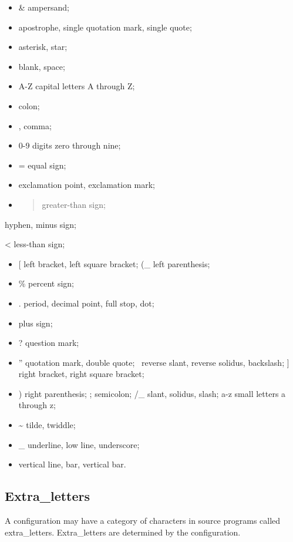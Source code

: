\begin{itemize}
\item
  \& ampersand;
\item
  apostrophe, single quotation mark, single quote;
\item
  asterisk, star;
\item
  blank, space;
\item
  A-Z capital letters A through Z;
\item
  colon;
\item
  , comma;
\item
  0-9 digits zero through nine;
\item
  = equal sign;
\item
  exclamation point, exclamation mark;
\item
  \begin{quote}
  greater-than sign;
  \end{quote}
\end{itemize}

hyphen, minus sign;

\textless{} less-than sign;

\begin{itemize}
\item
  {[} left bracket, left square bracket; (\_ left parenthesis;
\item
  \% percent sign;
\item
  . period, decimal point, full stop, dot;
\item
  plus sign;
\item
  ? question mark;
\item
  '' quotation mark, double quote; ~reverse slant, reverse solidus,
  backslash; {]} right bracket, right square bracket;
\item
  ) right parenthesis; ; semicolon; /\_ slant, solidus, slash; a-z small
  letters a through z;
\item
  \textasciitilde{} tilde, twiddle;
\item
  \_ underline, low line, underscore;
\item
  vertical line, bar, vertical bar.
\end{itemize}

\hypertarget{extra_letters}{%
\subsection{Extra\_letters}\label{extra_letters}}

A configuration may have a category of characters in source programs
called extra\_letters. Extra\_letters are determined by the
configuration.

